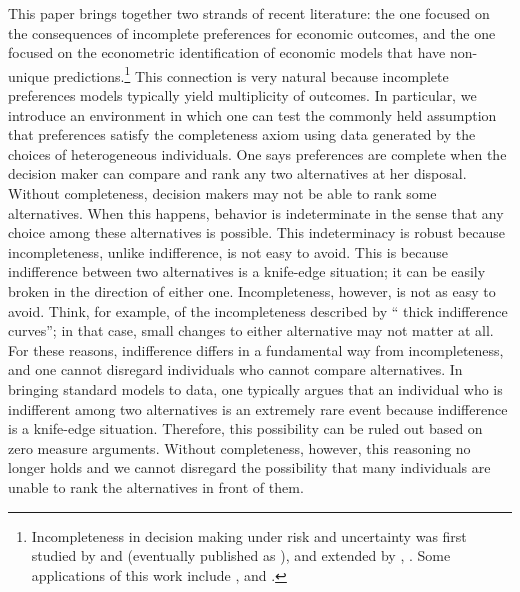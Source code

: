 \documentclass[reqno]{article}
\renewcommand{\cite}{\citet}
\begin{document}
This paper brings together two strands of recent literature: the one focused
on the consequences of incomplete preferences for economic outcomes, and the
one focused on the econometric identification of economic models that have
non-unique predictions.\footnote{Incompleteness in decision making under risk and uncertainty was first studied by \cite{Aumann62} and \cite{Bewley86} (eventually published as \cite{Bewley02}), and extended by \cite{DubraMaccheroniOk04}, \cite{Ok02}. Some applications of this work include \cite{RigottiShannon05}, and \cite{LopomoRigottiShannon11}.} This connection is very natural because
incomplete preferences models typically yield multiplicity of outcomes. In
particular, we introduce an environment in which one can test the commonly
held assumption that preferences satisfy the completeness axiom using data
generated by the choices of heterogeneous individuals. One says preferences
are complete when the decision maker can compare and rank any two
alternatives at her disposal. Without completeness, decision makers may not
be able to rank some alternatives. When this happens, behavior is
indeterminate in the sense that any choice among these alternatives is
possible. This indeterminacy is robust because incompleteness, unlike
indifference, is not easy to avoid. This is because indifference between two
alternatives is a knife-edge situation; it can be easily broken in the
direction of either one. Incompleteness, however, is not as easy to avoid.
Think, for example, of the incompleteness described by \textquotedblleft
thick indifference curves\textquotedblright ; in that case, small changes to
either alternative may not matter at all. For these reasons, indifference
differs in a fundamental way from incompleteness, and one cannot disregard
individuals who cannot compare alternatives. In bringing standard models to
data, one typically argues that an individual who is indifferent among two
alternatives is an extremely rare event because indifference is a knife-edge
situation. Therefore, this possibility can be ruled out based on zero
measure arguments. Without completeness, however, this reasoning no longer
holds and we cannot disregard the possibility that many individuals are
unable to rank the alternatives in front of them.
\end{document}
